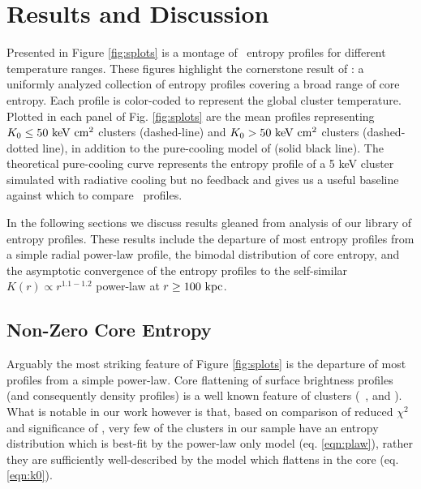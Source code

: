 \documentclass[12pt,preprint]{aastex}
\begin{document}
\section{Results and Discussion}
\label{sec:r&d}

Presented in Figure \ref{fig:splots} is a montage of \accept\ entropy
profiles for different temperature ranges. These figures highlight the
cornerstone result of \accept: a uniformly analyzed collection of
entropy profiles covering a broad range of core entropy. Each profile
is color-coded to represent the global cluster temperature. Plotted in
each panel of Fig. \ref{fig:splots} are the mean profiles representing
$K_0 \le 50 \mathrm{\mbox{\ensuremath{\mathrm{~keV}}} \mathrm{\mbox{\ensuremath{\mathrm{~cm}}}^2}}$ clusters (dashed-line) and $K_0 > 50 \mathrm{\mbox{\ensuremath{\mathrm{~keV}}} \mathrm{\mbox{\ensuremath{\mathrm{~cm}}}^2}}$
clusters (dashed-dotted line), in addition to the pure-cooling model
of \citet{voitbryan} (solid black line). The theoretical pure-cooling
curve represents the entropy profile of a 5 keV cluster simulated with
radiative cooling but no feedback and gives us a useful baseline
against which to compare \accept\ profiles.

In the following sections we discuss results gleaned from analysis of
our library of entropy profiles. These results include the departure
of most entropy profiles from a simple radial power-law profile, the
bimodal distribution of core entropy, and the asymptotic convergence
of the entropy profiles to the self-similar $K(r) \propto r^{1.1-1.2}$
power-law at $r \geq 100\mbox{\ensuremath{\mathrm{~kpc}}}$.

\subsection{Non-Zero Core Entropy}
\label{sec:nonzerok0}

Arguably the most striking feature of Figure \ref{fig:splots} is the
departure of most profiles from a simple power-law. Core flattening of
surface brightness profiles (and consequently density profiles) is a
well known feature of clusters (\eg\ \citealt{1984ApJ...276...38J},
\citealt{1999ApJ...517..627M} and \citealt{2000MNRAS.318..715X}). What
is notable in our work however is that, based on comparison of reduced
$\chi^2$ and significance of \kna, very few of the clusters in our
sample have an entropy distribution which is best-fit by the power-law
only model (eq. \ref{eqn:plaw}), rather they are sufficiently
well-described by the model which flattens in the core
(eq. \ref{eqn:k0}).
\end{document}
